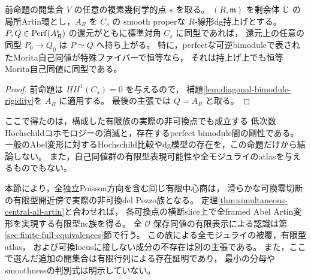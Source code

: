 \begin{corollary}\label{cor:noncommutative-diagonal-artin-rigidity}
前命題の開集合 $V$ の任意の複素幾何学的点 $s$ を取る。
$(R,\mathfrak m)$ を剰余体 $\mathbb C$ の局所Artin環とし，$A_R$ を $C_s$ の
smooth properな $R$-線形dg持上げとする。
$P,Q\in\operatorname{Perf}(A_R^{\mathrm e})$ の還元がともに標準対角 $C_s$ に同型であれば，
還元上の任意の同型 $P_0\to Q_0$ は $P\simeq Q$ へ持ち上がる。
特に，perfectな可逆bimoduleで表されたMorita自己同値が特殊ファイバーで恒等なら，
それは持上げ上でも恒等Morita自己同値に同型である。
\end{corollary}
\begin{proof}
前命題は $HH^1(C_s)=0$ を与えるので，
補題\ref{lem:diagonal-bimodule-rigidity}を $A_R$ に適用する。
最後の主張では $Q=A_R$ と取る。
\end{proof}

\begin{remark}
ここで得たのは，構成した有限族の実際の非可換点でも成立する
低次数Hochschildコホモロジーの消滅と，存在するperfect bimodule間の剛性である。
一般のAbel変形に対するHochschild比較やdg模型の存在を，この命題だけから結論しない。
また，自己同値群の有限型表現可能性や全モジュライのatlasを与えるものでもない。
\end{remark}


\begin{remark}\label{rem:simultaneous-geometric-scope}
本節により，全独立Poisson方向を含む同じ有限中心商は，
滑らかな可換零切断の有限型開近傍で実際の非可換del Pezzo族となる。
定理\ref{thm:simultaneous-central-all-artin}と合わせれば，
各可換点の横断slice上で全framed Abel Artin変形を実現する有限型nc族を得る。
全 $\mathcal O$ 保存同値の有限表示による認識は第\ref{sec:finite-full-equivalences}節で行う。
この族による全モジュライの被覆，有限型atlas，
および可換locusに接しない成分の不存在は別の主張である。
また，ここで選んだ追加の開集合は有限行列による存在証明であり，
最小の分母やsmoothnessの判別式は明示していない。
\end{remark}

